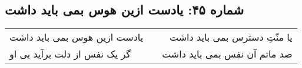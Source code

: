 \begin{center}
\section*{شماره ۴۵: یادست ازین هوس بمی باید داشت}
\label{sec:045}
\begin{longtable}{l p{0.5cm} r}
یادست ازین هوس بمی باید داشت
&&
یا منّتِ دسترس بمی باید داشت
\\
گر یک نفس از دلت برآید بی او
&&
صد ماتم آن نفس بمی باید داشت
\\
\end{longtable}
\end{center}
